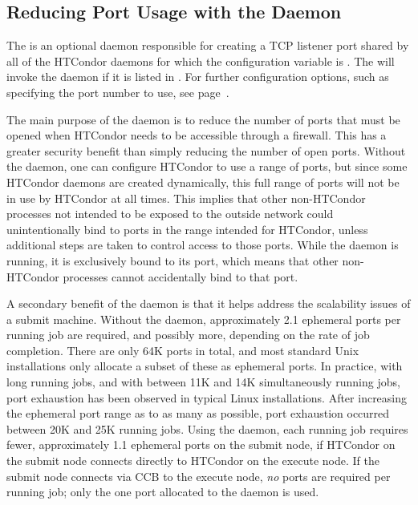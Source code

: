 \subsection{\label{sec:shared-port-daemon}Reducing Port Usage with the  Daemon}

The  is an optional daemon
responsible for creating a TCP listener port shared by all of the
HTCondor daemons for which the configuration variable
 is .
The  will invoke the  daemon
if it is listed in .  For further configuration
options, such as specifying the port number to use, see page~\pageref{sec:Config-shared-port}.

The main purpose of the  daemon is to reduce the
number of ports that must be opened when HTCondor needs to be
accessible through a firewall.
This has a greater security benefit
than simply reducing the number of open ports.
Without the  daemon,
one can configure HTCondor to use a range of ports,
but since some HTCondor daemons are created dynamically, 
this full range of ports will not be in use by HTCondor at all times.
This implies that other non-HTCondor processes not intended to be exposed to
the outside network could unintentionally bind to ports in the range
intended for HTCondor,
unless additional steps are taken to control access to those ports.  
While the  daemon is running,
it is exclusively bound to its port, which means that other non-HTCondor
processes cannot accidentally bind to that port.

A secondary benefit of the  daemon
is that it helps address the scalability issues of a submit machine.
Without the  daemon,
approximately 2.1 ephemeral ports per running job are required,
and possibly more, depending on the rate of job completion.
There are only 64K ports in total,
and most standard Unix installations only allocate a subset of
these as ephemeral ports.
In practice, with long running jobs,
and with between 11K and 14K simultaneously running jobs,
port exhaustion has been observed in typical Linux installations.
After increasing the ephemeral port range as to as many as possible,
port exhaustion occurred between 20K and 25K running jobs.
Using the  daemon,
each running job requires fewer, approximately 1.1 ephemeral ports
on the submit node, if HTCondor on the submit node connects directly
to HTCondor on the execute node.
If the submit node connects via CCB to the execute
node, \emph{no} ports are required per running job; only the one port
allocated to the  daemon is used.

